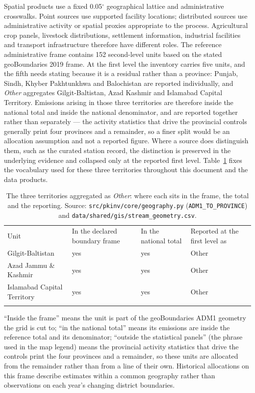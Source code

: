 \documentclass[essd]{copernicus}
\begin{document}
Spatial products use a fixed 0.05$^{\circ}$ geographical lattice and administrative crosswalks. Point sources use supported facility locations; distributed sources use administrative activity or spatial proxies appropriate to the process. Agricultural crop panels, livestock distributions, settlement information, industrial facilities and transport infrastructure therefore have different roles. The reference administrative frame contains 152 second-level units based on the stated geoBoundaries 2019 frame. At the first level the inventory carries five units, and the fifth needs stating because it is a residual rather than a province: Punjab, Sindh, Khyber Pakhtunkhwa and Balochistan are reported individually, and \emph{Other} aggregates Gilgit-Baltistan, Azad Kashmir and Islamabad Capital Territory. Emissions arising in those three territories are therefore inside the national total and inside the national denominator, and are reported together rather than separately --- the activity statistics that drive the provincial controls generally print four provinces and a remainder, so a finer split would be an allocation assumption and not a reported figure. Where a source does distinguish them, such as the curated station record, the distinction is preserved in the underlying evidence and collapsed only at the reported first level.
Table~\ref{tab:other_units} fixes the vocabulary used for these three territories throughout this document and the data products.
\begin{table}[h]
\caption{The three territories aggregated as \emph{Other}: where each sits in the frame, the total and the reporting. Source: \texttt{src/pkinv/core/geography.py} (\texttt{ADM1\_TO\_PROVINCE}) and \texttt{data/shared/gis/stream\_geometry.csv}.}
\label{tab:other_units}
\begin{tabular}{llll}
\tophline
Unit & In the declared boundary frame & In the national total & Reported at the first level as \\
\middlehline
Gilgit-Baltistan & yes & yes & Other \\
Azad Jammu \& Kashmir & yes & yes & Other \\
Islamabad Capital Territory & yes & yes & Other \\
\bottomhline
\end{tabular}
\end{table}
``Inside the frame'' means the unit is part of the geoBoundaries ADM1 geometry the grid is cut to; ``in the national total'' means its emissions are inside the reference total and its denominator; ``outside the statistical panels'' (the phrase used in the map legend) means the provincial activity statistics that drive the controls print the four provinces and a remainder, so these units are allocated from the remainder rather than from a line of their own. Historical allocations on this frame describe estimates within a common geography rather than observations on each year's changing district boundaries.
\end{document}
